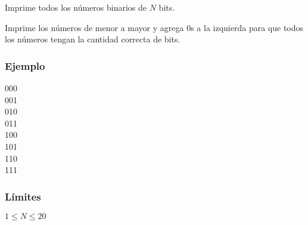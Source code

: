 Imprime todos los números binarios de \(N\) bits. 

Imprime los números de menor a mayor y agrega 0s a la izquierda para que todos los números tengan la cantidad correcta de bits.

\subsubsection*{Ejemplo}
\begin{casebox2}
	{
		000 \\
		001 \\
		010 \\
		011 \\
		100 \\
		101 \\
		110 \\
		111 \\
	}
	\hline
\end{casebox2}

\subsubsection*{Límites}
\begin{plimits}
	\item \(1\leq N \leq 20\)
\end{plimits}
